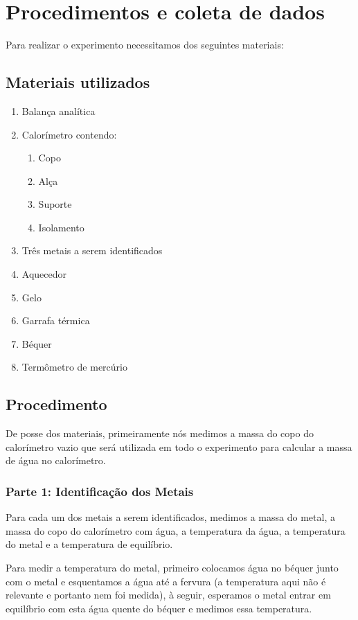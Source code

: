 \documentclass[a4paper]{article}
\begin{document}
	\section{Procedimentos e coleta de dados}

		Para realizar o experimento necessitamos dos seguintes materiais:


		\subsection{Materiais utilizados}
			\begin{enumerate}
			\item Balança analítica
			\item Calorímetro contendo: 

			\begin{enumerate}
				\item Copo 
				\item Alça
				\item Suporte
				\item Isolamento
			\end{enumerate}
			\item Três metais a serem identificados 
			\item Aquecedor 
			\item Gelo 
			\item Garrafa térmica 
			\item Béquer
			\item Termômetro de mercúrio 
			\end{enumerate}

		\subsection{Procedimento}

		De posse dos materiais, primeiramente nós medimos a massa do copo
		do calorímetro vazio que será utilizada em todo o experimento para
		calcular a massa de água no calorímetro.


			\subsubsection{Parte 1: Identificação dos Metais}

				Para cada um dos metais a serem identificados, medimos a massa do
				metal, a massa do copo do calorímetro com água, a temperatura da água,
				a temperatura do metal e a temperatura de equilíbrio. 

				Para medir a temperatura do metal, primeiro colocamos água no béquer
				junto com o metal e esquentamos a água até a fervura (a temperatura
				aqui não é relevante e portanto nem foi medida), à seguir, esperamos
				o metal entrar em equilíbrio com esta água quente do béquer e medimos
				essa temperatura. 
\end{document}
